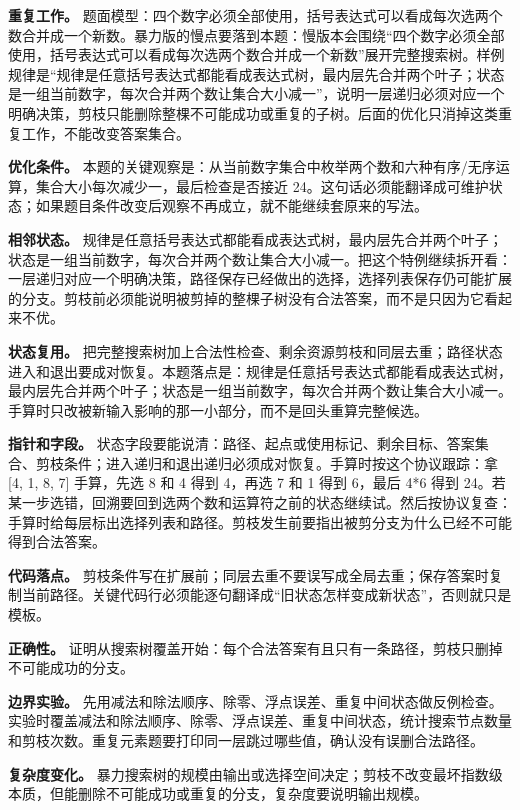 \textbf{重复工作。} 题面模型：四个数字必须全部使用，括号表达式可以看成每次选两个数合并成一个新数。暴力版的慢点要落到本题：慢版本会围绕“四个数字必须全部使用，括号表达式可以看成每次选两个数合并成一个新数”展开完整搜索树。样例规律是“规律是任意括号表达式都能看成表达式树，最内层先合并两个叶子；状态是一组当前数字，每次合并两个数让集合大小减一”，说明一层递归必须对应一个明确决策，剪枝只能删除整棵不可能成功或重复的子树。后面的优化只消掉这类重复工作，不能改变答案集合。

\textbf{优化条件。} 本题的关键观察是：从当前数字集合中枚举两个数和六种有序/无序运算，集合大小每次减少一，最后检查是否接近 24。这句话必须能翻译成可维护状态；如果题目条件改变后观察不再成立，就不能继续套原来的写法。

\textbf{相邻状态。} 规律是任意括号表达式都能看成表达式树，最内层先合并两个叶子；状态是一组当前数字，每次合并两个数让集合大小减一。把这个特例继续拆开看：一层递归对应一个明确决策，路径保存已经做出的选择，选择列表保存仍可能扩展的分支。剪枝前必须能说明被剪掉的整棵子树没有合法答案，而不是只因为它看起来不优。

\textbf{状态复用。} 把完整搜索树加上合法性检查、剩余资源剪枝和同层去重；路径状态进入和退出要成对恢复。本题落点是：规律是任意括号表达式都能看成表达式树，最内层先合并两个叶子；状态是一组当前数字，每次合并两个数让集合大小减一。手算时只改被新输入影响的那一小部分，而不是回头重算完整候选。

\textbf{指针和字段。} 状态字段要能说清：路径、起点或使用标记、剩余目标、答案集合、剪枝条件；进入递归和退出递归必须成对恢复。手算时按这个协议跟踪：拿 [4, 1, 8, 7] 手算，先选 8 和 4 得到 4，再选 7 和 1 得到 6，最后 4*6 得到 24。若某一步选错，回溯要回到选两个数和运算符之前的状态继续试。然后按协议复查：手算时给每层标出选择列表和路径。剪枝发生前要指出被剪分支为什么已经不可能得到合法答案。

\textbf{代码落点。} 剪枝条件写在扩展前；同层去重不要误写成全局去重；保存答案时复制当前路径。关键代码行必须能逐句翻译成“旧状态怎样变成新状态”，否则就只是模板。

\textbf{正确性。} 证明从搜索树覆盖开始：每个合法答案有且只有一条路径，剪枝只删掉不可能成功的分支。

\textbf{边界实验。} 先用减法和除法顺序、除零、浮点误差、重复中间状态做反例检查。实验时覆盖减法和除法顺序、除零、浮点误差、重复中间状态，统计搜索节点数量和剪枝次数。重复元素题要打印同一层跳过哪些值，确认没有误删合法路径。

\textbf{复杂度变化。} 暴力搜索树的规模由输出或选择空间决定；剪枝不改变最坏指数级本质，但能删除不可能成功或重复的分支，复杂度要说明输出规模。

